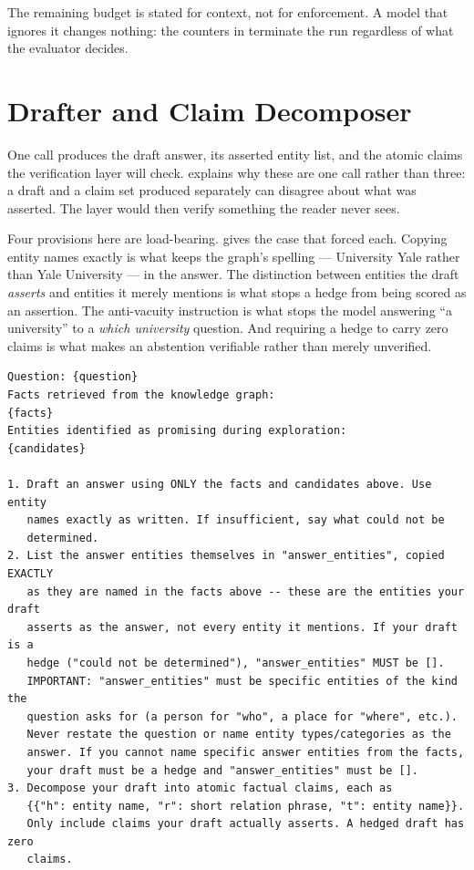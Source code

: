 The remaining budget is stated for context, not for enforcement. A model that
ignores it changes nothing: the counters in  terminate the run
regardless of what the evaluator decides.

\section{Drafter and Claim Decomposer}\label{app:prompt-draft}

One call produces the draft answer, its asserted entity list, and the atomic
claims the verification layer will check. 
explains why these are one call rather than three: a draft and a claim set
produced separately can disagree about what was asserted. The layer would
then verify something the reader never sees.

Four provisions here are load-bearing.  gives
the case that forced each. Copying entity names exactly is what keeps the
graph's spelling --- \textsf{University Yale} rather than \textsf{Yale
University} --- in the answer. The distinction between entities the draft
\emph{asserts} and entities it merely mentions is what stops a hedge from being
scored as an assertion. The anti-vacuity instruction is what stops the model
answering ``a university'' to a \emph{which university} question. And requiring
a hedge to carry zero claims is what makes an abstention verifiable rather than
merely unverified.

\begin{lstlisting}[style=verbatimblock]
Question: {question}
Facts retrieved from the knowledge graph:
{facts}
Entities identified as promising during exploration:
{candidates}

1. Draft an answer using ONLY the facts and candidates above. Use entity
   names exactly as written. If insufficient, say what could not be
   determined.
2. List the answer entities themselves in "answer_entities", copied EXACTLY
   as they are named in the facts above -- these are the entities your draft
   asserts as the answer, not every entity it mentions. If your draft is a
   hedge ("could not be determined"), "answer_entities" MUST be [].
   IMPORTANT: "answer_entities" must be specific entities of the kind the
   question asks for (a person for "who", a place for "where", etc.).
   Never restate the question or name entity types/categories as the
   answer. If you cannot name specific answer entities from the facts,
   your draft must be a hedge and "answer_entities" must be [].
3. Decompose your draft into atomic factual claims, each as
   {{"h": entity name, "r": short relation phrase, "t": entity name}}.
   Only include claims your draft actually asserts. A hedged draft has zero
   claims.
\end{lstlisting}

